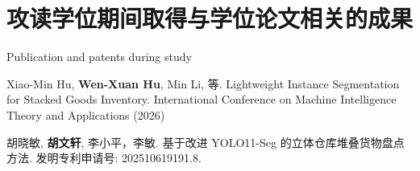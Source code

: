 \chapter{攻读学位期间取得与学位论文相关的成果}{Publication and patents during study}


\begin{results}
  \item Xiao-Min Hu, \textbf{Wen-Xuan Hu}, Min Li, 等. Lightweight Instance Segmentation 
for Stacked Goods Inventory.  International Conference on Machine Intelligence Theory and Applications (2026) 
\end{results}


\begin{results}
  \item 胡晓敏, \textbf{胡文轩}, 李小平，李敏. 基于改进 YOLO11-Seg 的立体仓库堆叠货物盘点方法. 发明专利申请号: 202510619191.8.
\end{results}